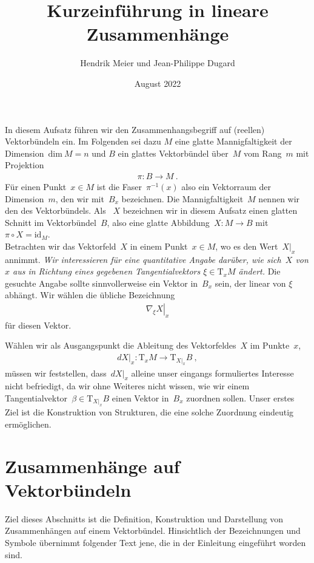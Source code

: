\documentclass[10pt,a4paper]{article}
\title{Kurzeinführung in lineare Zusammenhänge}
\author{Hendrik Meier und Jean-Philippe Dugard}
\affil{Vernon, Frankreich}
\date{August 2022}
\newcommand{\mydef}[1]{\textls{#1}}
\begin{document}
\maketitle

In diesem Aufsatz führen wir den Zusammenhangs\-begriff auf (reellen) Vektorbündeln ein.
Im Folgenden sei dazu $M$ eine glatte Mannigfaltigkeit der Dimension~$\mathrm{dim}\ M = n$ und $B$ ein glattes Vektorbündel über~$M$ vom Rang~$m$ mit Projektion
\begin{align*}
\pi:B\rightarrow M
\ .
\end{align*}
Für einen Punkt~$x\in M$ ist die Faser~$\pi^{-1}(x)$ also ein Vektorraum der Dimension~$m$, den wir mit~$B_x$ bezeichnen.
Die Mannigfaltigkeit~$M$ nennen wir den \mydef{Grundraum} des Vektorbündels.
Als \mydef{Vektorfeld}~$X$ bezeichnen wir in diesem Aufsatz einen glatten Schnitt im Vektorbündel~$B$, also eine glatte Abbildung~$X:M\rightarrow B$ mit~$\pi\circ X = \mathrm{id}_M$.\\

Betrachten wir das Vektorfeld~$X$ in einem Punkt~$x\in M$, wo es den Wert~$X|_x$ annimmt.
\emph{Wir interessieren für eine quantitative Angabe darüber, wie sich~$X$ von $x$ aus in Richtung eines gegebenen Tangential\-vektors $\xi\in \mathrm{T}_xM$ ändert.} 
Die gesuchte Angabe sollte sinnvollerweise ein Vektor in~$B_x$ sein, der linear von $\xi$ abhängt.
Wir wählen die übliche Bezeichnung
\begin{align*}
\left.\nabla_\xi X\right|_x
\end{align*}
für diesen Vektor.

Wählen wir als Ausgangspunkt die Ableitung des Vektorfeldes~$X$ im Punkte~$x$,
\begin{align*}
dX|_x : \mathrm{T}_xM \rightarrow \mathrm{T}_{X|_x}B
\ ,
\end{align*}
müssen wir feststellen, dass~$dX|_x$ alleine unser eingangs formuliertes Interesse nicht befriedigt, da wir ohne Weiteres nicht wissen, wie wir einem Tangential\-vektor~$\beta\in \mathrm{T}_{X|_x} B$ einen Vektor in~$B_x$ zuordnen sollen.
Unser erstes Ziel ist die Konstruktion von Strukturen, die eine solche Zuordnung eindeutig ermöglichen.

\newpage

\section{Zusammenhänge auf Vektorbündeln}

Ziel dieses Abschnitts ist die Definition, Konstruktion und Darstellung von Zusammenhängen auf einem Vektorbündel.
Hinsichtlich der Bezeichnungen und Symbole übernimmt folgender Text jene, die in der Einleitung eingeführt worden sind.
\end{document}
